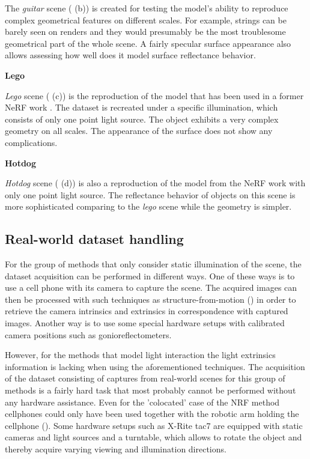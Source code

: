 The \textit{guitar} scene ( (b)) is created for testing the model's ability
to reproduce complex geometrical features on different scales.
For example, strings can be barely seen on renders and they would presumably be the most troublesome geometrical part of the whole scene.
A fairly specular surface appearance also allows assessing how well does it model surface reflectance behavior.

\textbf{Lego}

\textit{Lego} scene ( (c)) is the reproduction of the model
that has been used in a former NeRF work \cite{mildenhall2020nerf}.
The dataset is recreated under a specific illumination,
which consists of only one point light source.
The object exhibits a very complex geometry on all scales.
The appearance of the surface does not show any complications.

\textbf{Hotdog}

\textit{Hotdog} scene ( (d)) is also a reproduction of the model
from the NeRF work with only one point light source.
The reflectance behavior of objects on this scene is more sophisticated
comparing to the \textit{lego} scene while the geometry is simpler.


\subsection{Real-world dataset handling}

For the group of methods that only consider static illumination of the scene,
the dataset acquisition can be performed in different ways.
One of these ways is to use a cell phone with its camera to capture the scene.
The acquired images can then be processed with such techniques as
structure-from-motion (\cite{Moulon2012, Jancosek2011, schoenberger2016structure})
in order to retrieve the camera intrinsics and extrinsics in correspondence with captured images.
Another way is to use some special hardware setups with calibrated camera positions
such as gonioreflectometers.

However, for the methods that model light interaction the light extrinsics information is lacking
when using the aforementioned techniques.
The acquisition of the dataset consisting of captures from real-world scenes
for this group of methods is a fairly hard task that most probably cannot be performed without any hardware assistance.
Even for the 'colocated' case of the NRF method cellphones could only have been used
together with the robotic arm holding the cellphone (\cite{bi2020neural}).
Some hardware setups such as X-Rite tac7 \cite{merzbach2017highquality} are equipped with static cameras and light sources
and a turntable, which allows to rotate the object and thereby acquire varying viewing and illumination directions.


